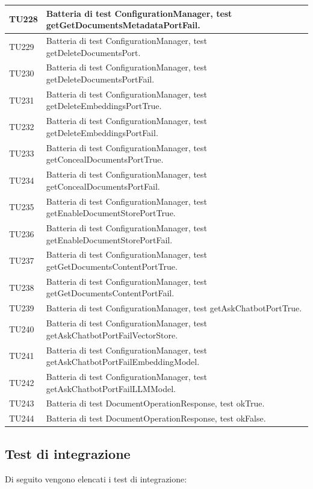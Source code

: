 \documentclass[10pt, a4paper]{article}
\begin{document}
\begin{xltabular}{\textwidth}{p{0.12\textwidth}|X}
\hline
TU228 & Batteria di test ConfigurationManager, test getGetDocumentsMetadataPortFail. \\
\hline
TU229 & Batteria di test ConfigurationManager, test getDeleteDocumentsPort. \\
\hline
TU230 & Batteria di test ConfigurationManager, test getDeleteDocumentsPortFail. \\
\hline
TU231 & Batteria di test ConfigurationManager, test getDeleteEmbeddingsPortTrue. \\
\hline
TU232 & Batteria di test ConfigurationManager, test getDeleteEmbeddingsPortFail. \\
\hline
TU233 & Batteria di test ConfigurationManager, test getConcealDocumentsPortTrue. \\
\hline
TU234 & Batteria di test ConfigurationManager, test getConcealDocumentsPortFail. \\
\hline
TU235 & Batteria di test ConfigurationManager, test getEnableDocumentStorePortTrue. \\
\hline
TU236 & Batteria di test ConfigurationManager, test getEnableDocumentStorePortFail. \\
\hline
TU237 & Batteria di test ConfigurationManager, test getGetDocumentsContentPortTrue. \\
\hline
TU238 & Batteria di test ConfigurationManager, test getGetDocumentsContentPortFail. \\
\hline
TU239 & Batteria di test ConfigurationManager, test getAskChatbotPortTrue. \\
\hline
TU240 & Batteria di test ConfigurationManager, test getAskChatbotPortFailVectorStore. \\
\hline
TU241 & Batteria di test ConfigurationManager, test getAskChatbotPortFailEmbeddingModel. \\
\hline
TU242 & Batteria di test ConfigurationManager, test getAskChatbotPortFailLLMModel. \\
\hline
TU243 & Batteria di test DocumentOperationResponse, test okTrue. \\
\hline
TU244 & Batteria di test DocumentOperationResponse, test okFalse. \\
\hline
\end{xltabular}



\subsection{Test di integrazione}
Di seguito vengono elencati i test di integrazione:
\end{document}
